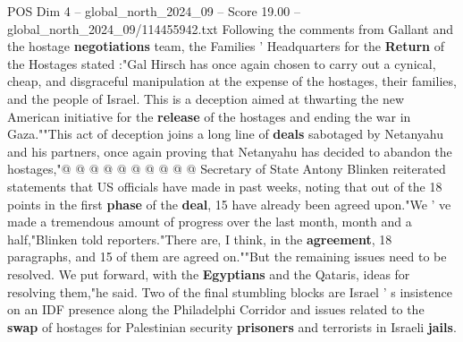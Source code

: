\begin{textsample}{POS Dim 4 – global\_north\_2024\_09 – Score 19.00 – global\_north\_2024\_09/114455942.txt}
Following the comments from Gallant and the hostage \textbf{negotiations} team, the Families ' Headquarters for the \textbf{Return} of the Hostages stated :"Gal Hirsch has once again chosen to carry out a cynical, cheap, and disgraceful manipulation at the expense of the hostages, their families, and the people of Israel.
This is a deception aimed at thwarting the new American initiative for the \textbf{release} of the hostages and ending the war in Gaza.""This act of deception joins a long line of \textbf{deals} sabotaged by Netanyahu and his partners, once again proving that Netanyahu has decided to abandon the hostages,"@ @ @ @ @ @ @ @ @ @ Secretary of State Antony Blinken reiterated statements that US officials have made in past weeks, noting that out of the 18 points in the first \textbf{phase} of the \textbf{deal}, 15 have already been agreed upon."We ' ve made a tremendous amount of progress over the last month, month and a half,"Blinken told reporters."There are, I think, in the \textbf{agreement}, 18 paragraphs, and 15 of them are agreed on.""But the remaining issues need to be resolved.
We put forward, with the \textbf{Egyptians} and the Qataris, ideas for resolving them,"he said.
Two of the final stumbling blocks are Israel ' s insistence on an IDF presence along the Philadelphi Corridor and issues related to the \textbf{swap} of hostages for Palestinian security \textbf{prisoners} and terrorists in Israeli \textbf{jails}.

\end{textsample}
